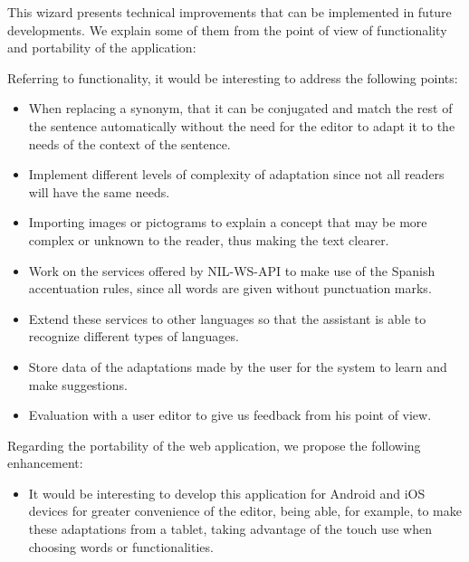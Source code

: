 This wizard presents technical improvements that can be implemented in future developments. We explain some of them from the point of view of functionality and portability of the application:

Referring to functionality, it would be interesting to address the following points:

\begin{itemize}
\item When replacing a synonym, that it can be conjugated and match the rest of the sentence automatically without the need for the editor to adapt it to the needs of the context of the sentence.
\item Implement different levels of complexity of adaptation since not all readers will have the same needs.
\item Importing images or pictograms to explain a concept that may be more complex or unknown to the reader, thus making the text clearer.
\item Work on the services offered by NIL-WS-API to make use of the Spanish accentuation rules, since all words are given without punctuation marks.
\item Extend these services to other languages so that the assistant is able to recognize different types of languages.

\item Store data of the adaptations made by the user for the system to learn and make suggestions.
\item Evaluation with a user editor to give us feedback from his point of view.
\end{itemize}	
Regarding the portability of the web application, we propose the following enhancement:
\begin{itemize}
\item It would be interesting to develop this application for Android and iOS devices for greater convenience of the editor, being able, for example, to make these adaptations from a tablet, taking advantage of the touch use when choosing words or functionalities.

\end{itemize}


